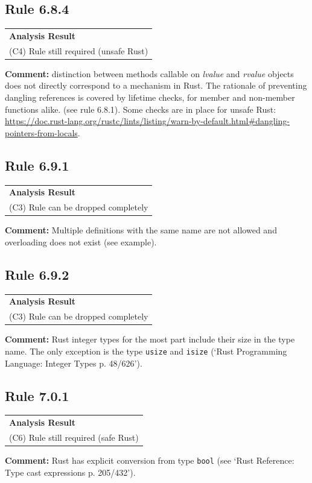 \subsection*{Rule 6.8.4}
\begin{longtable}{p{13cm}}
\textbf{Analysis Result} \\
(C4) Rule still required (unsafe Rust) \\
\end{longtable}
\textbf{Comment:} \Cpp distinction between methods callable on \textit{lvalue} and \textit{rvalue} objects does not directly correspond to a mechanism in Rust. The rationale of preventing dangling references is covered by lifetime checks, for member and non-member functions alike. (see rule 6.8.1). Some checks are in place for unsafe Rust: \url{https://doc.rust-lang.org/rustc/lints/listing/warn-by-default.html#dangling-pointers-from-locals}. \\
\subsection*{Rule 6.9.1}
\begin{longtable}{p{13cm}}
\textbf{Analysis Result} \\
(C3) Rule can be dropped completely \\
\end{longtable}
\textbf{Comment:} Multiple definitions with the same name are not allowed and overloading does not exist (see example). \\


\subsection*{Rule 6.9.2}
\begin{longtable}{p{13cm}}
\textbf{Analysis Result} \\
(C3) Rule can be dropped completely \\
\end{longtable}
\textbf{Comment:} Rust integer types for the most part include their size in the type name. The only exception is the type \texttt{usize} and \texttt{isize} (`Rust Programming Language: Integer Types p. 48/626'). \\
\subsection*{Rule 7.0.1}
\begin{longtable}{p{13cm}}
\textbf{Analysis Result} \\
(C6) Rule still required (safe Rust) \\
\end{longtable}
\textbf{Comment:} Rust has explicit conversion from type \texttt{bool} (see `Rust Reference: Type cast expressions p. 205/432'). \\


